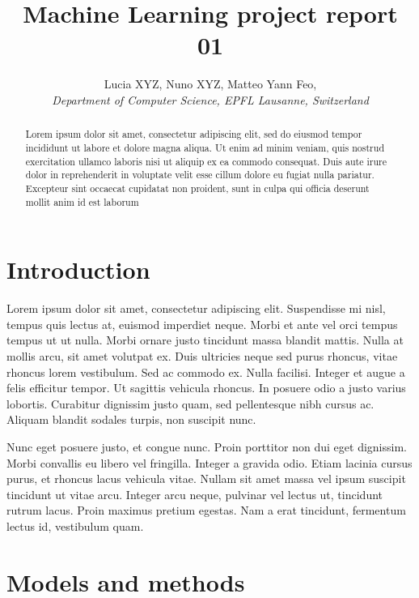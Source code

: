 \documentclass[10pt,conference,compsocconf]{IEEEtran}
\begin{document}
\title{Machine Learning project report 01}

\author{
  Lucia XYZ, Nuno XYZ, Matteo Yann Feo,  \\
  \textit{Department of Computer Science, EPFL Lausanne, Switzerland}
}

\maketitle

\begin{abstract}
  Lorem ipsum dolor sit amet, consectetur adipiscing elit, sed do eiusmod tempor incididunt ut  
  labore et dolore magna aliqua. Ut enim ad minim veniam, quis nostrud exercitation ullamco laboris 
  nisi ut aliquip ex ea commodo consequat. Duis aute irure dolor in reprehenderit in voluptate 
  velit esse cillum dolore eu fugiat nulla pariatur. Excepteur sint occaecat cupidatat non 
  proident, sunt in culpa qui officia deserunt mollit anim id est laborum
\end{abstract}

\section{Introduction}

Lorem ipsum dolor sit amet, consectetur adipiscing elit. Suspendisse mi nisl, tempus quis lectus at, euismod imperdiet neque. Morbi et ante vel orci tempus tempus ut ut nulla. Morbi ornare justo tincidunt massa blandit mattis. Nulla at mollis arcu, sit amet volutpat ex. Duis ultricies neque sed purus rhoncus, vitae rhoncus lorem vestibulum. Sed ac commodo ex. Nulla facilisi. Integer et augue a felis efficitur tempor. Ut sagittis vehicula rhoncus. In posuere odio a justo varius lobortis. Curabitur dignissim justo quam, sed pellentesque nibh cursus ac. Aliquam blandit sodales turpis, non suscipit nunc.

Nunc eget posuere justo, et congue nunc. Proin porttitor non dui eget dignissim. Morbi convallis eu libero vel fringilla. Integer a gravida odio. Etiam lacinia cursus purus, et rhoncus lacus vehicula vitae. Nullam sit amet massa vel ipsum suscipit tincidunt ut vitae arcu. Integer arcu neque, pulvinar vel lectus ut, tincidunt rutrum lacus. Proin maximus pretium egestas. Nam a erat tincidunt, fermentum lectus id, vestibulum quam.


\section{Models and methods}
\label{sec:models-methods}
\end{document}
